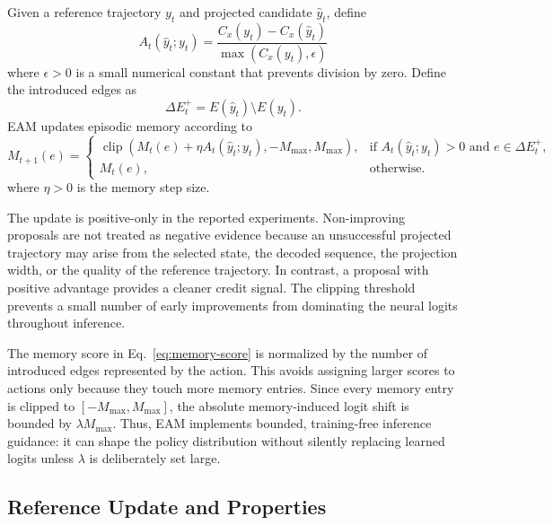 \documentclass[11pt]{article}
\newcommand{\EAM}{\textsc{EAM}}
\newcommand{\cost}{C}
\newcommand{\clip}{\operatorname{clip}}
\begin{document}
Given a reference trajectory $y_t$ and projected candidate $\hat y_t$, define
\begin{equation}
  A_t(\hat y_t;y_t)=
  \frac{\cost_x(y_t)-\cost_x(\hat y_t)}{\max(\cost_x(y_t),\epsilon)}
  \label{eq:advantage}
\end{equation}
where $\epsilon>0$ is a small numerical constant that prevents division by zero. Define the introduced edges as
\begin{equation}
  \Delta E_t^+=E(\hat y_t)\setminus E(y_t).
  \label{eq:introduced}
\end{equation}
\EAM{} updates episodic memory according to
\begin{equation}
  M_{t+1}(e)=
  \begin{cases}
  \clip(M_t(e)+\eta A_t(\hat y_t;y_t),-M_{\max},M_{\max}),
  & \text{if } A_t(\hat y_t;y_t)>0 \text{ and } e\in\Delta E_t^+,\\
  M_t(e), & \text{otherwise.}
  \end{cases}
  \label{eq:update}
\end{equation}
where $\eta>0$ is the memory step size.

The update is positive-only in the reported experiments. Non-improving proposals are not treated as negative evidence because an unsuccessful projected trajectory may arise from the selected state, the decoded sequence, the projection width, or the quality of the reference trajectory. In contrast, a proposal with positive advantage provides a cleaner credit signal. The clipping threshold prevents a small number of early improvements from dominating the neural logits throughout inference.

The memory score in Eq.~\eqref{eq:memory-score} is normalized by the number of introduced edges represented by the action. This avoids assigning larger scores to actions only because they touch more memory entries. Since every memory entry is clipped to $[-M_{\max},M_{\max}]$, the absolute memory-induced logit shift is bounded by $\lambda M_{\max}$. Thus, \EAM{} implements bounded, training-free inference guidance: it can shape the policy distribution without silently replacing learned logits unless $\lambda$ is deliberately set large.

\subsection{Reference Update and Properties}
\end{document}
